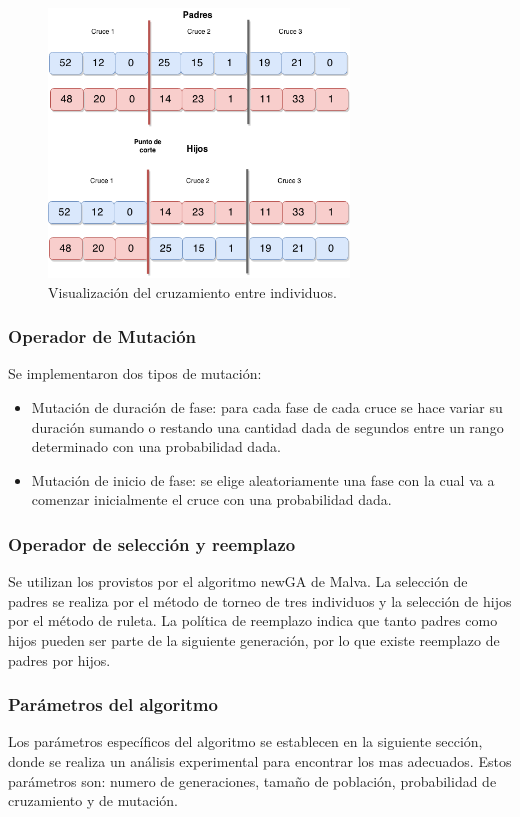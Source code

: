 \begin{figure}[H]
	\centering
	\includegraphics[width=8cm]{Figures/alg_cruzamiento}
	\caption{Visualización del cruzamiento entre individuos.}
	\label{fig:op_cruzamiento}
\end{figure}



\subsubsection{Operador de Mutación}
Se implementaron dos tipos de mutación:
\begin{itemize}

\item Mutación de duración de fase: para cada fase de cada cruce se
hace variar su duración sumando o restando una cantidad dada
de segundos entre un rango determinado con una probabilidad
dada.
\item Mutación de inicio de fase: se elige aleatoriamente una fase
con la cual va a comenzar inicialmente el cruce con una probabilidad dada.

\end{itemize}

\subsubsection{Operador de selección y reemplazo}
Se  utilizan los provistos por el algoritmo newGA de Malva. La selección de padres se realiza por el método de torneo de tres individuos y la selección de hijos por el método de ruleta. La política de reemplazo indica que tanto padres como hijos pueden ser parte de la siguiente generación, por lo que existe reemplazo de padres por hijos.

\subsubsection{Parámetros del algoritmo}
Los parámetros específicos del algoritmo se establecen en la siguiente sección, donde se realiza un análisis experimental para encontrar los mas adecuados. Estos parámetros son: numero de generaciones, tamaño de población, probabilidad de cruzamiento y de mutación.